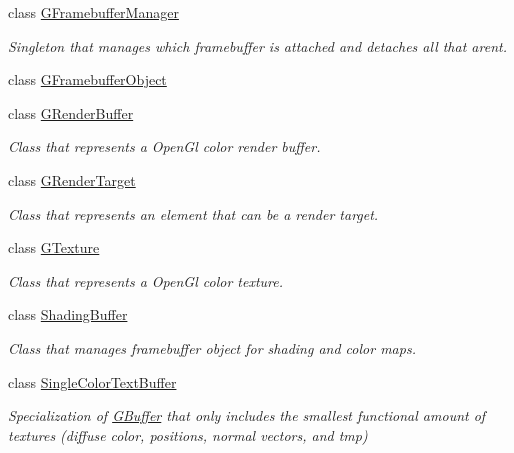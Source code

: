 \begin{DoxyCompactItemize}
class \mbox{\hyperlink{class_geometry_engine_1_1_geometry_buffer_1_1_g_framebuffer_manager}{G\+Framebuffer\+Manager}}
\begin{DoxyCompactList}\small\item\em Singleton that manages which framebuffer is attached and detaches all that aren\textquotesingle{}t. \end{DoxyCompactList}\item 
class \mbox{\hyperlink{class_geometry_engine_1_1_geometry_buffer_1_1_g_framebuffer_object}{G\+Framebuffer\+Object}}
\item 
class \mbox{\hyperlink{class_geometry_engine_1_1_geometry_buffer_1_1_g_render_buffer}{G\+Render\+Buffer}}
\begin{DoxyCompactList}\small\item\em Class that represents a Open\+Gl color render buffer. \end{DoxyCompactList}\item 
class \mbox{\hyperlink{class_geometry_engine_1_1_geometry_buffer_1_1_g_render_target}{G\+Render\+Target}}
\begin{DoxyCompactList}\small\item\em Class that represents an element that can be a render target. \end{DoxyCompactList}\item 
class \mbox{\hyperlink{class_geometry_engine_1_1_geometry_buffer_1_1_g_texture}{G\+Texture}}
\begin{DoxyCompactList}\small\item\em Class that represents a Open\+Gl color texture. \end{DoxyCompactList}\item 
class \mbox{\hyperlink{class_geometry_engine_1_1_geometry_buffer_1_1_shading_buffer}{Shading\+Buffer}}
\begin{DoxyCompactList}\small\item\em Class that manages framebuffer object for shading and color maps. \end{DoxyCompactList}\item 
class \mbox{\hyperlink{class_geometry_engine_1_1_geometry_buffer_1_1_single_color_text_buffer}{Single\+Color\+Text\+Buffer}}
\begin{DoxyCompactList}\small\item\em Specialization of \mbox{\hyperlink{class_geometry_engine_1_1_geometry_buffer_1_1_g_buffer}{G\+Buffer}} that only includes the smallest functional amount of textures (diffuse color, positions, normal vectors, and tmp) \end{DoxyCompactList}\end{DoxyCompactItemize}
